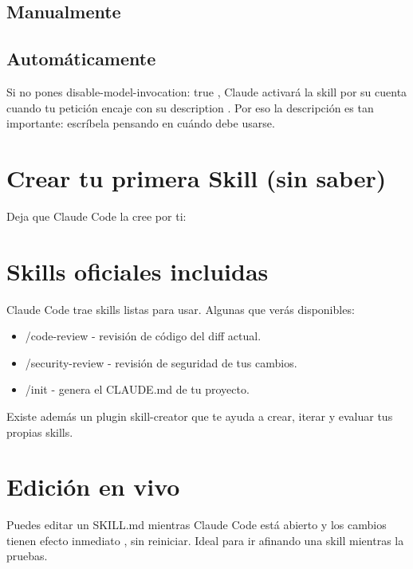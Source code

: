 \documentclass[11pt,a4paper]{book}
\begin{document}
\subsection{Manualmente}
\subsection{Automáticamente}
Si no pones disable-model-invocation: true , Claude activará la skill por su cuenta cuando tu petición encaje con su description . Por eso la descripción es tan importante: escríbela pensando en cuándo debe usarse.

\section{Crear tu primera Skill (sin saber)}
Deja que Claude Code la cree por ti:

\section{Skills oficiales incluidas}
Claude Code trae skills listas para usar. Algunas que verás disponibles:

\begin{itemize}\item /code-review - revisión de código del diff actual.\end{itemize}
\begin{itemize}\item /security-review - revisión de seguridad de tus cambios.\end{itemize}
\begin{itemize}\item /init - genera el CLAUDE.md de tu proyecto.\end{itemize}
Existe además un plugin skill-creator que te ayuda a crear, iterar y evaluar tus propias skills.

\section{Edición en vivo}
Puedes editar un SKILL.md mientras Claude Code está abierto y los cambios tienen efecto inmediato , sin reiniciar. Ideal para ir afinando una skill mientras la pruebas.
\end{document}
